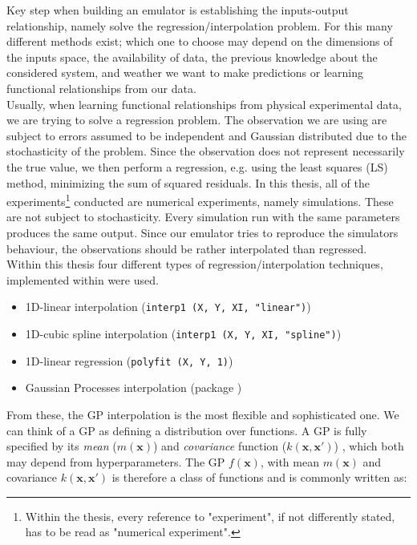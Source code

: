 
Key step when building an emulator is establishing the inputs-output relationship, namely solve the regression/interpolation problem.
For this many different methods exist; which one to choose may depend on the dimensions of the inputs space, the availability of data, the previous knowledge about the considered system, and weather we want to make predictions or learning functional relationships from our data.\\

Usually, when learning functional relationships from physical experimental data, we are trying to solve a regression problem.
The observation we are using are subject to errors assumed to be independent and Gaussian distributed due to the stochasticity of the problem.
Since the observation does not represent necessarily the true value, we then perform a regression, e.g. using the least squares (LS) method, minimizing the sum of squared residuals.
In this thesis, all of the experiments\footnote{Within the thesis, every reference to "experiment", if not differently stated, has to be read as "numerical experiment".} conducted are numerical experiments, namely simulations.
These are not subject to stochasticity.
Every simulation run with the same parameters produces the same output.
Since our emulator tries to reproduce the simulators behaviour, the observations should be rather interpolated than regressed.\\

Within this thesis four different types of regression/interpolation techniques, implemented within  were used.

\begin{itemize}
\itemsep0em
  \item 1D-linear interpolation (\texttt{interp1 (X, Y, XI, "linear")})
  \item 1D-cubic spline interpolation (\texttt{interp1 (X, Y, XI, "spline")})
  \item 1D-linear regression (\texttt{polyfit (X, Y, 1)})
  \item Gaussian Processes interpolation (package )
\end{itemize}

From these, the GP interpolation is the most flexible and sophisticated one.
We can think of a GP as defining a distribution over functions.
A GP is fully specified by its \emph{mean} ($m(\bm{x})$) and \emph{covariance} function ($k(\bm{x},\bm{x}')$) \autocite{rasmussen_gaussian_2006}, which both may depend from hyperparameters.
The GP $f(\bm{x})$, with mean $m(\bm{x})$ and covariance $k(\bm{x},\bm{x}')$ is therefore a class of functions and is commonly written as:


